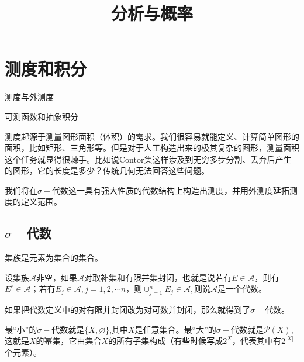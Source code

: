 \documentclass[lang=cn,10pt]{elegantbook}
\title{分析与概率}
\begin{document}
	
	
	\maketitle
	\frontmatter
	
	\tableofcontents
	
	\mainmatter
	\chapter{测度和积分}
	\begin{introduction}
		\item 测度与外测度
		\item 可测函数和抽象积分
	\end{introduction}
	测度起源于测量图形面积（体积）的需求。我们很容易就能定义、计算简单图形的面积，比如矩形、三角形等。但是对于人工构造出来的极其复杂的图形，测量面积这个任务就显得很棘手。比如说Contor集这样涉及到无穷多步分割、丢弃后产生的图形，它的长度是多少？传统几何无法回答这些问题。

	我们将在\(\sigma-\)代数这一具有强大性质的代数结构上构造出测度，并用外测度延拓测度的定义范围。
	\section{\(\sigma-\)代数}
	集族是元素为集合的集合。
	\begin{definition}
		设集族\(\mathcal{A}\)非空，如果\(\mathcal{A}\)对取补集和有限并集封闭，也就是说若有\(E\in \mathcal{A}\)，则有\(E^c\in \mathcal{A}\)；若有\(E_j\in \mathcal{A},j=1,2,\cdots n\)，则\(\cup_{j=1}^nE_j\in \mathcal{A},\)则说\(\mathcal{A}\)是一个代数。

		如果把代数定义中的对有限并封闭改为对可数并封闭，那么就得到了\(\sigma-\)代数。
	\end{definition}
	最“小”的\(\sigma-\)代数就是\(\{X,\varnothing\}\),其中\(X\)是任意集合。最“大”的\(\sigma-\)代数就是\(\mathcal{P}(X)\),这就是\(X\)的幂集，它由集合\(X\)的所有子集构成（有些时候写成\(2^X\)，代表其中有\(2^{|X|}\)个元素）。
\end{document}
